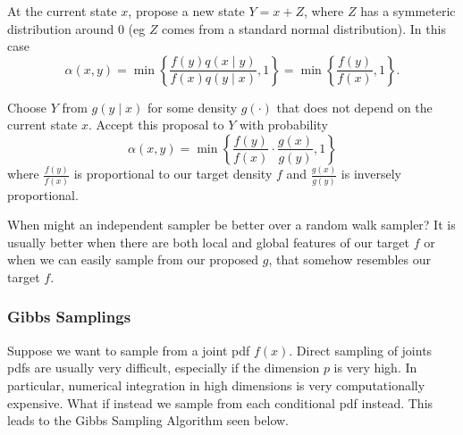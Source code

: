 \begin{exam} \label{exam: MC_samp_2}
    At the current state $x$, propose a new state $Y = x + Z$, where $Z$ has a symmeteric distribution around $0$ (eg $Z$ comes from a standard normal distribution). In this case
    \[
        \alpha (x,y) = \min \left\{
        \frac{f(y) q(x \mid y)}{f(x) q(y \mid x)} , 1
        \right\} = \min \left\{
        \frac{f(y)}{f(x)} , 1
        \right\} .
    \]
\end{exam}

\begin{exam} \label{exam: MC_samp_3}
    Choose $Y$ from $g(y \mid x)$ for some density $g(\cdot)$ that does not depend on the current state $x$. Accept this proposal to $Y$ with probability
    \[
        \alpha (x,y) = \min \left\{ \frac{f(y)}{f(x)} \cdot \frac{g(x)}{g(y)} , 1 \right\}
    \]
    where $\frac{f(y)}{f(x)}$ is proportional to our target density $f$ and $\frac{g(x)}{g(y)}$ is inversely proportional.
\end{exam}

When might an independent sampler be better over a random walk sampler? It is usually better when there are both local and global features of our target $f$ or when we can easily sample from our proposed $g$, that somehow resembles our target $f$.

\subsubsection*{Gibbs Samplings}

Suppose we want to sample from a joint pdf $f(x)$. Direct sampling of joints pdfs are usually very difficult, especially if the dimension $p$ is very high. In particular, numerical integration in high dimensions is very computationally expensive. What if instead we sample from each conditional pdf instead. This leads to the Gibbs Sampling Algorithm seen below.

